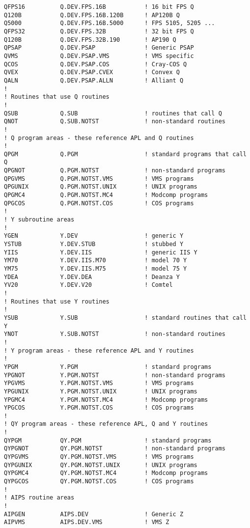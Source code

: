 \begin{verbatim}
QFPS16          Q.DEV.FPS.16B           ! 16 bit FPS Q
Q120B           Q.DEV.FPS.16B.120B      ! AP120B Q
Q5000           Q.DEV.FPS.16B.5000      ! FPS 5105, 5205 ...
QFPS32          Q.DEV.FPS.32B           ! 32 bit FPS Q
Q120B           Q.DEV.FPS.32B.190       ! AP190 Q
QPSAP           Q.DEV.PSAP              ! Generic PSAP
QVMS            Q.DEV.PSAP.VMS          ! VMS specific
QCOS            Q.DEV.PSAP.COS          ! Cray-COS Q
QVEX            Q.DEV.PSAP.CVEX         ! Convex Q
QALN            Q.DEV.PSAP.ALLN         ! Alliant Q
!
! Routines that use Q routines
!
QSUB            Q.SUB                   ! routines that call Q
QNOT            Q.SUB.NOTST             ! non-standard routines
!
! Q program areas - these reference APL and Q routines
!
QPGM            Q.PGM                   ! standard programs that call Q
QPGNOT          Q.PGM.NOTST             ! non-standard programs
QPGVMS          Q.PGM.NOTST.VMS         ! VMS programs
QPGUNIX         Q.PGM.NOTST.UNIX        ! UNIX programs
QPGMC4          Q.PGM.NOTST.MC4         ! Modcomp programs
QPGCOS          Q.PGM.NOTST.COS         ! COS programs
!
! Y subroutine areas
!
YGEN            Y.DEV                   ! generic Y
YSTUB           Y.DEV.STUB              ! stubbed Y
YIIS            Y.DEV.IIS               ! generic IIS Y
YM70            Y.DEV.IIS.M70           ! model 70 Y
YM75            Y.DEV.IIS.M75           ! model 75 Y
YDEA            Y.DEV.DEA               ! Deanza Y
YV20            Y.DEV.V20               ! Comtel
!
! Routines that use Y routines
!
YSUB            Y.SUB                   ! standard routines that call Y
YNOT            Y.SUB.NOTST             ! non-standard routines
!
! Y program areas - these reference APL and Y routines
!
YPGM            Y.PGM                   ! standard programs
YPGNOT          Y.PGM.NOTST             ! non-standard programs
YPGVMS          Y.PGM.NOTST.VMS         ! VMS programs
YPGUNIX         Y.PGM.NOTST.UNIX        ! UNIX programs
YPGMC4          Y.PGM.NOTST.MC4         ! Modcomp programs
YPGCOS          Y.PGM.NOTST.COS         ! COS programs
!
! QY program areas - these reference APL, Q and Y routines
!
QYPGM           QY.PGM                  ! standard programs
QYPGNOT         QY.PGM.NOTST            ! non-standard programs
QYPGVMS         QY.PGM.NOTST.VMS        ! VMS programs
QYPGUNIX        QY.PGM.NOTST.UNIX       ! UNIX programs
QYPGMC4         QY.PGM.NOTST.MC4        ! Modcomp programs
QYPGCOS         QY.PGM.NOTST.COS        ! COS programs
!
! AIPS routine areas
!
AIPGEN          AIPS.DEV                ! Generic Z
AIPVMS          AIPS.DEV.VMS            ! VMS Z

\end{verbatim}
